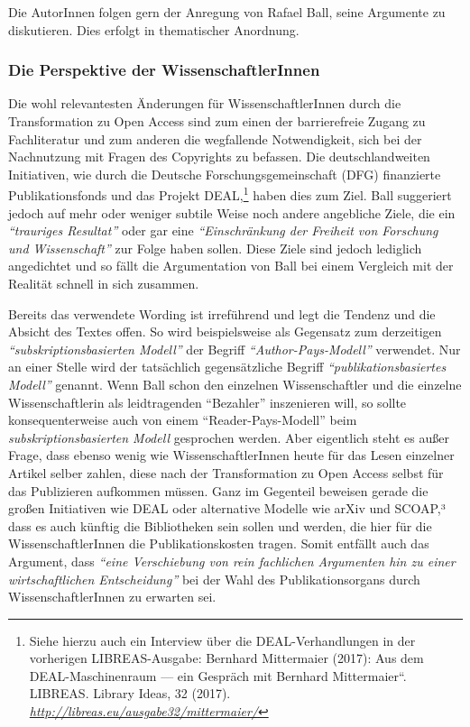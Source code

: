 \documentclass[a4paper,
fontsize=11pt,
oneside,
numbers=noperiodatend,
parskip=half-,
bibliography=totoc,
final
]{scrartcl}
\begin{document}
Die AutorInnen folgen gern der Anregung von Rafael Ball, seine Argumente
zu diskutieren. Dies erfolgt in thematischer Anordnung.

\subsubsection{Die Perspektive der
WissenschaftlerInnen}\label{die-perspektive-der-wissenschaftlerinnen}

Die wohl relevantesten Änderungen für WissenschaftlerInnen durch die
Transformation zu Open Access sind zum einen der barrierefreie Zugang zu
Fachliteratur und zum anderen die wegfallende Notwendigkeit, sich bei
der Nachnutzung mit Fragen des Copyrights zu befassen. Die
deutschlandweiten Initiativen, wie durch die Deutsche
Forschungsgemeinschaft (DFG) finanzierte Publikationsfonds und das
Projekt DEAL,\footnote{Siehe hierzu auch ein Interview über die
  DEAL-Verhandlungen in der vorherigen LIBREAS-Ausgabe: Bernhard
  Mittermaier (2017): Aus dem DEAL-Maschinenraum --- ein Gespräch mit
  Bernhard Mittermaier``. LIBREAS. Library Ideas, 32 (2017).
  \href{http://libreas.eu/ausgabe32/mittermaier/}{\emph{http://libreas.eu/ausgabe32/mittermaier/}}}
haben dies zum Ziel. Ball suggeriert jedoch auf mehr oder weniger
subtile Weise noch andere angebliche Ziele, die ein
\emph{\enquote{trauriges Resultat}} oder gar eine
\emph{\enquote{Einschränkung der Freiheit von Forschung und
Wissenschaft}} zur Folge haben sollen. Diese Ziele sind jedoch lediglich
angedichtet und so fällt die Argumentation von Ball bei einem Vergleich
mit der Realität schnell in sich zusammen.

Bereits das verwendete Wording ist irreführend und legt die Tendenz und
die Absicht des Textes offen. So wird beispielsweise als Gegensatz zum
derzeitigen \emph{\enquote{subskriptionsbasierten Modell}} der Begriff
\emph{\enquote{Author-Pays-Modell}} verwendet. Nur an einer Stelle wird
der tatsächlich gegensätzliche Begriff
\emph{\enquote{publikationsbasiertes Modell}} genannt. Wenn Ball schon
den einzelnen Wissenschaftler und die einzelne Wissenschaftlerin als
leidtragenden \enquote{Bezahler} inszenieren will, so sollte
konsequenterweise auch von einem \enquote{Reader-Pays-Modell} beim
\emph{subskriptionsbasierten Modell} gesprochen werden. Aber eigentlich
steht es außer Frage, dass ebenso wenig wie WissenschaftlerInnen heute
für das Lesen einzelner Artikel selber zahlen, diese nach der
Transformation zu Open Access selbst für das Publizieren aufkommen
müssen. Ganz im Gegenteil beweisen gerade die großen Initiativen wie
DEAL oder alternative Modelle wie arXiv und SCOAP,³ dass es auch künftig
die Bibliotheken sein sollen und werden, die hier für die
WissenschaftlerInnen die Publikationskosten tragen. Somit entfällt auch
das Argument, dass \emph{\enquote{eine Verschiebung von rein fachlichen
Argumenten hin zu einer wirtschaftlichen Entscheidung}} bei der Wahl des
Publikationsorgans durch WissenschaftlerInnen zu erwarten sei.
\end{document}
